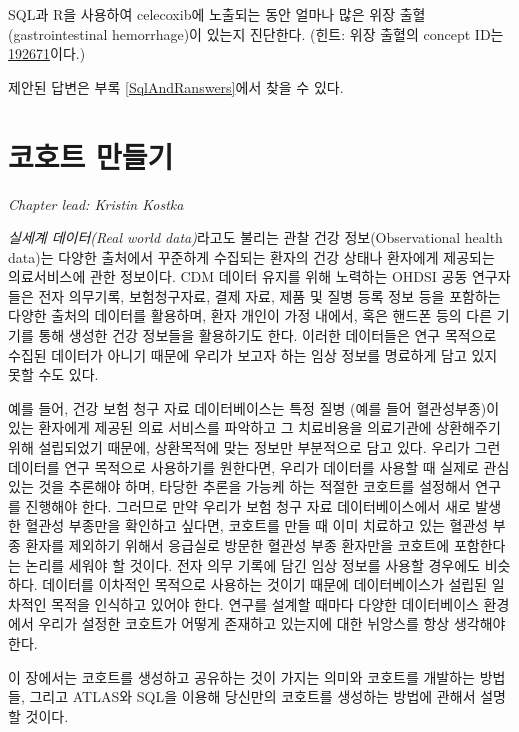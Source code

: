 \documentclass[11pt]{book}
\theoremstyle{definition}
\theoremstyle{definition}
\theoremstyle{definition}
\theoremstyle{remark}
\begin{document}
\protect\hypertarget{exr:exerciseGiBleedsDuringCelecoxib}{}{\label{exr:exerciseGiBleedsDuringCelecoxib}
}SQL과 R을 사용하여 celecoxib에 노출되는 동안 얼마나 많은 위장
출혈(gastrointestinal hemorrhage)이 있는지 진단한다. (힌트: 위장 출혈의
concept ID는
\href{http://athena.ohdsi.org/search-terms/terms/192671}{192671}이다.)

제안된 답변은 부록 \ref{SqlAndRanswers}에서 찾을 수 있다.

\chapter{코호트 만들기}\label{Cohorts}

\emph{Chapter lead: Kristin Kostka}

\emph{실세계 데이터(Real world data)}라고도 불리는 관찰 건강
정보(Observational health data)는 다양한 출처에서 꾸준하게 수집되는
환자의 건강 상태나 환자에게 제공되는 의료서비스에 관한 정보이다. CDM
데이터 유지를 위해 노력하는 OHDSI 공동 연구자들은 전자 의무기록,
보험청구자료, 결제 자료, 제품 및 질병 등록 정보 등을 포함하는 다양한
출처의 데이터를 활용하며, 환자 개인이 가정 내에서, 혹은 핸드폰 등의 다른
기기를 통해 생성한 건강 정보들을 활용하기도 한다. 이러한 데이터들은 연구
목적으로 수집된 데이터가 아니기 때문에 우리가 보고자 하는 임상 정보를
명료하게 담고 있지 못할 수도 있다.

예를 들어, 건강 보험 청구 자료 데이터베이스는 특정 질병 (예를 들어
혈관성부종)이 있는 환자에게 제공된 의료 서비스를 파악하고 그 치료비용을
의료기관에 상환해주기 위해 설립되었기 때문에, 상환목적에 맞는 정보만
부분적으로 담고 있다. 우리가 그런 데이터를 연구 목적으로 사용하기를
원한다면, 우리가 데이터를 사용할 때 실제로 관심 있는 것을 추론해야 하며,
타당한 추론을 가능케 하는 적절한 코호트를 설정해서 연구를 진행해야 한다.
그러므로 만약 우리가 보험 청구 자료 데이터베이스에서 새로 발생한 혈관성
부종만을 확인하고 싶다면, 코호트를 만들 때 이미 치료하고 있는 혈관성
부종 환자를 제외하기 위해서 응급실로 방문한 혈관성 부종 환자만을
코호트에 포함한다는 논리를 세워야 할 것이다. 전자 의무 기록에 담긴 임상
정보를 사용할 경우에도 비슷하다. 데이터를 이차적인 목적으로 사용하는
것이기 때문에 데이터베이스가 설립된 일차적인 목적을 인식하고 있어야
한다. 연구를 설계할 때마다 다양한 데이터베이스 환경에서 우리가 설정한
코호트가 어떻게 존재하고 있는지에 대한 뉘앙스를 항상 생각해야 한다.

이 장에서는 코호트를 생성하고 공유하는 것이 가지는 의미와 코호트를
개발하는 방법들, 그리고 ATLAS와 SQL을 이용해 당신만의 코호트를 생성하는
방법에 관해서 설명할 것이다.
\end{document}

